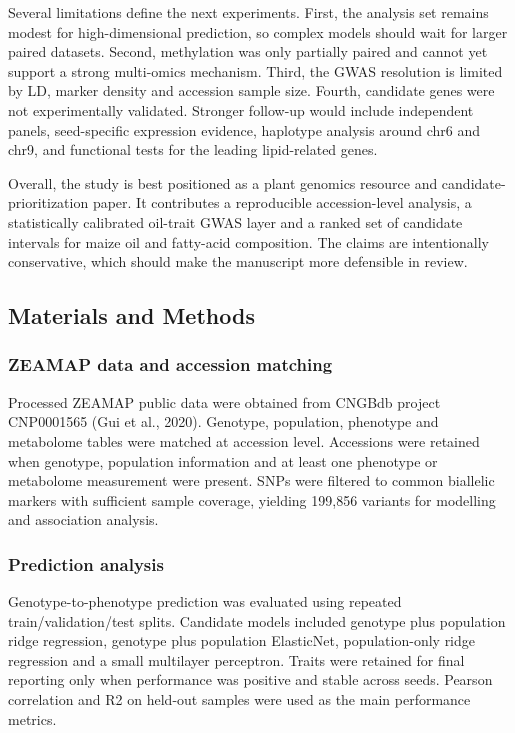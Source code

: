 \documentclass[
]{article}
\begin{document}
Several limitations define the next experiments. First, the analysis set
remains modest for high-dimensional prediction, so complex models should
wait for larger paired datasets. Second, methylation was only partially
paired and cannot yet support a strong multi-omics mechanism. Third, the
GWAS resolution is limited by LD, marker density and accession sample
size. Fourth, candidate genes were not experimentally validated.
Stronger follow-up would include independent panels, seed-specific
expression evidence, haplotype analysis around chr6 and chr9, and
functional tests for the leading lipid-related genes.

Overall, the study is best positioned as a plant genomics resource and
candidate-prioritization paper. It contributes a reproducible
accession-level analysis, a statistically calibrated oil-trait GWAS
layer and a ranked set of candidate intervals for maize oil and
fatty-acid composition. The claims are intentionally conservative, which
should make the manuscript more defensible in review.

\subsection{Materials and Methods}\label{materials-and-methods}

\subsubsection{ZEAMAP data and accession
matching}\label{zeamap-data-and-accession-matching}

Processed ZEAMAP public data were obtained from CNGBdb project
CNP0001565 (Gui et al., 2020). Genotype, population, phenotype and
metabolome tables were matched at accession level. Accessions were
retained when genotype, population information and at least one
phenotype or metabolome measurement were present. SNPs were filtered to
common biallelic markers with sufficient sample coverage, yielding
199,856 variants for modelling and association analysis.

\subsubsection{Prediction analysis}\label{prediction-analysis}

Genotype-to-phenotype prediction was evaluated using repeated
train/validation/test splits. Candidate models included genotype plus
population ridge regression, genotype plus population ElasticNet,
population-only ridge regression and a small multilayer perceptron.
Traits were retained for final reporting only when performance was
positive and stable across seeds. Pearson correlation and R2 on held-out
samples were used as the main performance metrics.
\end{document}
